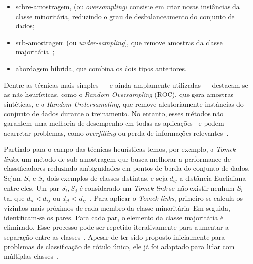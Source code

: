 \begin{itemize}
  \item sobre-amostragem, (ou \textit{oversampling}) consiste em criar novas instâncias da classe minoritária, reduzindo o grau de desbalanceamento do conjunto de dados;
  \item sub-amostragem (ou \textit{under-sampling}), que remove amostras da classe majoritária~\cite{Mohammed2020};
  \item abordagem híbrida, que combina os dois tipos anteriores.
\end{itemize}

Dentre as técnicas mais simples — e ainda amplamente utilizadas — destacam-se as não heurísticas, como o \textit{Random Oversampling} (ROC), que gera amostras sintéticas, e o \textit{Random Undersampling}, que remove aleatoriamente instâncias do conjunto de dados durante o treinamento. No entanto, esses métodos não garantem uma melhoria de desempenho em todas as aplicações~\cite{Yang2024} e podem acarretar problemas, como \textit{overfitting} ou perda de informações relevantes~\cite{Fernndez2018}.

Partindo para o campo das técnicas heurísticas temos, por exemplo, o \textit{Tomek links}, um método de sub-amostragem que busca melhorar a performance de classificadores reduzindo ambiguidades em pontos de borda do conjunto de dados. Sejam \(S_{i}\) e \(S_{j}\) dois exemplos de classes distintas, e seja \(d_{ij}\) a distância Euclidiana entre eles. Um par \(S_{i}, S_{j}\) é considerado um \textit{Tomek link} se não existir nenhum \(S_{l}\) tal que \(d_{il} < d_{ij}\) ou \(d_{jl} < d_{ij}\)~\cite{Batista2004}. Para aplicar o \textit{Tomek links}, primeiro se calcula os vizinhos mais próximos de cada membro da classe minoritária. Em seguida, identificam-se os pares. Para cada par, o elemento da classe majoritária é eliminado. Esse processo pode ser repetido iterativamente para aumentar a separação entre as classes~\cite{Arichandrapandian2024}. Apesar de ter sido proposto inicialmente para problemas de classificação de rótulo único, ele já foi adaptado para lidar com múltiplas classes~\cite{Pereira2020}.

